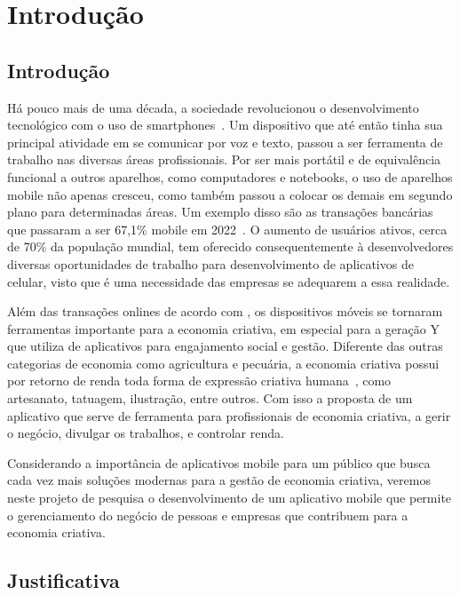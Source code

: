 \chapter{Introdução}\label{ch:introducao}
\section{Introdução}

Há pouco mais de uma década, a sociedade revolucionou o desenvolvimento tecnológico com o uso de smartphones~\cite{queiroz}.
Um dispositivo que até então tinha sua principal atividade em se comunicar por voz e texto, passou a ser ferramenta de trabalho nas diversas áreas profissionais.
Por ser mais portátil e de equivalência funcional a outros aparelhos, como computadores e notebooks, o uso de aparelhos mobile não apenas cresceu, como também passou a colocar os demais em segundo plano para determinadas áreas.
Um exemplo disso são as transações bancárias que passaram a ser 67,1\% mobile em 2022~\cite{bebraban2022}.
O aumento de usuários ativos, cerca de 70\% da população mundial\cite{wearesocial}, tem oferecido consequentemente à desenvolvedores diversas oportunidades de trabalho para desenvolvimento de aplicativos de celular, visto que é uma necessidade das empresas se adequarem a essa realidade.

Além das transações onlines de acordo com , os dispositivos móveis se tornaram ferramentas importante para a economia criativa, em especial para a geração Y que utiliza de aplicativos para engajamento social e gestão.
Diferente das outras categorias de economia como agricultura e pecuária, a economia criativa possui por retorno de renda toda forma de expressão criativa humana~\cite{sebrae}, como artesanato, tatuagem, ilustração, entre outros.
Com isso a proposta de um aplicativo que serve de ferramenta para profissionais de economia criativa, a gerir o negócio, divulgar os trabalhos, e controlar renda.

Considerando a importância de aplicativos mobile para um público que busca cada vez mais soluções modernas para a gestão de economia criativa, veremos neste projeto de pesquisa o desenvolvimento de um aplicativo mobile que permite o gerenciamento do negócio de pessoas e empresas que contribuem para a economia criativa.

\section{Justificativa}\label{sec:justificativa}

